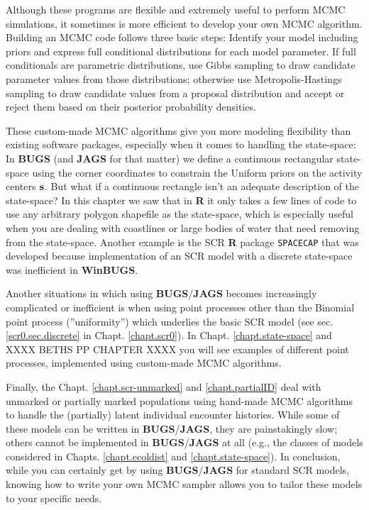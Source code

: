 Although these programs are flexible and extremely useful to perform MCMC simulations, it sometimes is more efficient to
develop your own MCMC algorithm. Building an MCMC code follows three basic
steps: Identify your model including priors and express full conditional
distributions for each model parameter. If full conditionals are parametric
distributions, use Gibbs sampling to draw candidate parameter values from
those distributions; otherwise use Metropolis-Hastings sampling to draw
candidate values from a proposal distribution and accept or reject them
based on their posterior probability densities.

These custom-made MCMC algorithms give you more modeling flexibility than
existing software packages, especially when it comes to handling the
 state-space: In {\bf BUGS} (and {\bf JAGS} for that matter) we define
  a continuous rectangular state-space using the corner coordinates to
  constrain the Uniform priors on the activity centers ${\bf s}$.
   But what if a continuous rectangle isn't an adequate description of
   the state-space? In this chapter we saw that in {\bf R} it only takes
   a few lines of code to use any arbitrary polygon shapefile as the
   state-space, which is especially useful when you are dealing with
   coastlines or large bodies of water that need removing from the
   state-space. Another example is the SCR {\bf R} package \mbox{\tt SPACECAP}
    \citep{gopalaswamy_etal:2012mee} that was developed because implementation
     of an SCR model with a discrete state-space was inefficient in {\bf WinBUGS}.

Another situations in which using {\bf BUGS}/{\bf JAGS} becomes
increasingly
complicated or inefficient is when using point processes other
than the
 Binomial point process (''uniformity'') which underlies the basic
 SCR model (see sec. \ref{scr0.sec.discrete} in Chapt. \ref {chapt.scr0}). In Chapt.
 \ref {chapt.state-space} and XXXX BETHS PP CHAPTER XXXX you will see examples of different point processes,
  implemented using custom-made MCMC algorithms.

Finally, the Chapt. \ref {chapt.scr-unmarked} and \ref {chapt.partialID} deal with unmarked or
partially marked populations using hand-made MCMC algorithms to
handle the (partially) latent individual encounter histories.
While some of these models can be written in {\bf BUGS}/{\bf JAGS}, they are painstakingly slow; others cannot be implemented in
 {\bf BUGS}/{\bf JAGS} at all (e.g., the classes of models
 considered in Chapts. \ref{chapt.ecoldist} and  \ref{chapt.state-space}).
In conclusion, while you can certainly get by using {\bf BUGS}/{\bf JAGS}
for standard SCR models, knowing how to write your own MCMC sampler
allows you to tailor these models to your specific needs.

